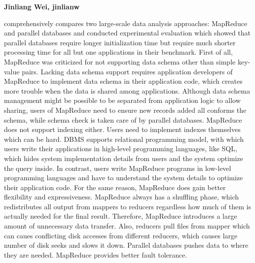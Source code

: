 \documentclass[12pt, a4paper]{llncs}
\begin{document}
\title{}
\author{Jinliang Wei, jinlianw}
\institute{}

\textbf{\centering Jinliang Wei, jinlianw}




\cite{Pavlo:2009:CAL:1559845.1559865} comprehensively compares two large-scale 
data analysis approaches: MapReduce and parallel databases and conducted 
experimental evaluation which showed that parallel databases require longer 
initialization time but require much shorter processing time for all but one 
applications in their benchmark. First of all, MapReduce was criticized for not 
supporting data schema other than simple key-value pairs. Lacking data schema 
support requires application developers of MapReduce to implement data schema in
their application code, which creates more trouble when the data is shared among
applications. Although data schema management might be possible to be separated
from application logic to allow sharing, users of MapReduce need to ensure new 
records added all conforms the schema, while schema check is taken care of by 
parallel databases. MapReduce does not support indexing either. Users need to 
implement indexes themselves which can be hard. DBMS supports relational 
programming model, with which users write their applications in high-level 
programming languages, like SQL, which hides system implementation details from 
users and the system optimize the query inside. In contrast, users write 
MapReduce programs in low-level programming languages and have to understand
the system details to optimize their application code. For the same reason, 
MapReduce does gain better flexibility and expressiveness. MapReduce always has 
a shuffling phase, which redistributes all output from mappers to reducers 
regardless how much of them is actually needed for the final result. Therefore, 
MapReduce introduces a large amount of unnecessary data transfer. Also, reducers
pull files from mapper which can caues conflicting disk accesses from different
reducers, which causes large number of disk seeks and slows it down. Parallel 
databases pushes data to where they are needed. MapReduce provides better fault 
tolerance.

\vspace{10pt}
\end{document}
